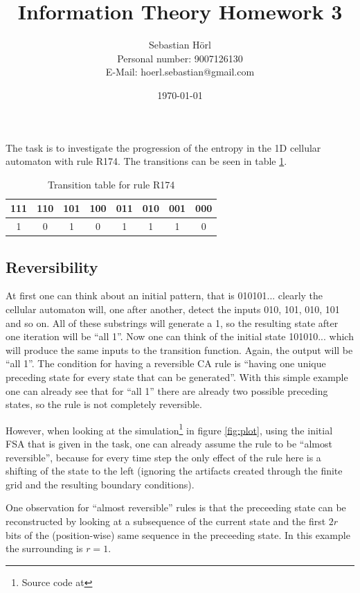 \documentclass[12pt]{scrartcl}
\title{Information Theory Homework 3}
\author{Sebastian Hörl\\Personal number: 9007126130\\E-Mail: hoerl.sebastian@gmail.com}
\date{\today}
\begin{document}
\maketitle

The task is to investigate the progression of the entropy in the 1D cellular automaton with rule R174. The transitions can be seen in table \ref{tab:1}.

\begin{table}
\centering
\begin{tabular}{c|c|c|c|c|c|c|c}
111 & 110 & 101 & 100 & 011 & 010 & 001 & 000\\ \hline
1 & 0 & 1 & 0 & 1 & 1 & 1 & 0
\end{tabular}
\caption{Transition table for rule R174}
\label{tab:1}
\end{table}

\subsection*{Reversibility}

At first one can think about an initial pattern, that is 010101... clearly the cellular automaton will, one after another, detect the inputs 010, 101, 010, 101 and so on. All of these substrings will generate a 1, so the resulting state after one iteration will be ``all 1''. Now one can think of the initial state 101010... which will produce the same inputs to the transition function. Again, the output will be ``all 1''. 
The condition for having a reversible CA rule is ``having one unique preceding state for every state that can be generated''. With this simple example one can already see that for ``all 1'' there are already two possible preceding states, so the rule is not completely reversible.

However, when looking at the simulation\footnote{Source code at} in figure \ref{fig:plot}, using the initial FSA that is given in the task, one can already assume the rule to be ``almost reversible'', because for every time step the only effect of the rule here is a shifting of the state to the left (ignoring the artifacts created through the finite grid and the resulting boundary conditions).

One observation for ``almost reversible'' rules is that the preceeding state can be reconstructed by looking at a subsequence of the current state and the first $2r$ bits of the (position-wise) same sequence in the preceeding state. In this example the surrounding is $r=1$. 
\end{document}
